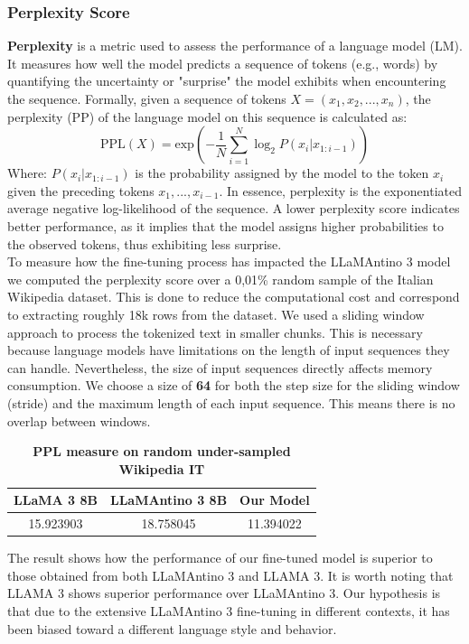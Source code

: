 \documentclass{article}
\begin{document}
	\subsubsection{Perplexity Score}
	\textbf{Perplexity} is a metric used to assess the performance of a language model (LM).	It measures how well the model predicts a sequence of tokens (e.g., words) by quantifying the uncertainty or "surprise" the model exhibits when encountering the sequence. Formally, given a sequence of tokens $X=(x_1,x_2,...,x_n)$, the perplexity (PP) of the language model on this sequence is calculated as:
	\begin{equation}
		\text{PPL}(X) = \text{exp}(-\frac{1}{N} \sum_{i=1}^{N} \log_2 P(x_i | x_{1:i-1}))
	\end{equation}
	Where: $P(x_i | x_{1:i-1})$ is the probability assigned by the model to the token $x_i$ given the preceding tokens $x_1,...,x_{i-1}$. In essence, perplexity is the exponentiated average negative log-likelihood of the sequence. A lower perplexity score indicates better performance, as it implies that the model assigns higher probabilities to the observed tokens, thus exhibiting less surprise.\\
	To measure how the fine-tuning process has impacted the LLaMAntino 3 model we computed the perplexity score over a 0,01\% random sample of the Italian Wikipedia dataset. This is done to reduce the computational cost and correspond to extracting roughly 18k rows from the dataset.
	We used a sliding window approach to process the tokenized text in smaller chunks. This is necessary because language models have limitations on the length of input sequences they can handle. Nevertheless, the size of input sequences directly affects memory consumption.
	We choose a size of \textbf{64} for both the step size for the sliding window (stride) and the maximum length of each input sequence. This means there is no overlap between windows.
	
	\begin{table}[h]
		\center
		\begin{tabular}{ccc}
			\toprule
			\textbf{LLaMA 3 8B} & \textbf{LLaMAntino 3 8B} & \textbf{Our Model} \\
			\midrule
			15.923903 & 18.758045 & 11.394022 \\
			\bottomrule
		\end{tabular}
		\caption{\textbf{PPL measure on random under-sampled Wikipedia IT}}
	\end{table} 

	The result shows how the performance of our fine-tuned model is superior to those obtained from both LLaMAntino 3 and LLAMA 3. It is worth noting that LLAMA 3 shows superior performance over LLaMAntino 3. Our hypothesis is that due to the extensive LLaMAntino 3 fine-tuning in different contexts, it has been biased toward a different language style and behavior.  
	
\end{document}
